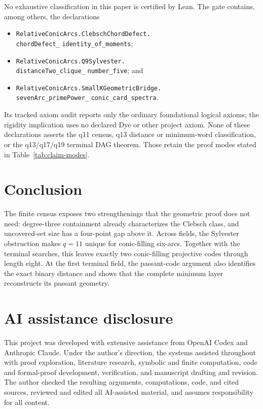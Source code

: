 \documentclass[11pt]{article}
\theoremstyle{remark}
\begin{document}
No exhaustive classification in this paper is certified by Lean.  The gate
contains, among others, the declarations
\begin{itemize}[nosep,leftmargin=2em]
\item \texttt{RelativeConicArcs.ClebschChordDefect.}\\
      \texttt{chordDefect\_}\allowbreak
      \texttt{identity\_of\_moments};
\item \texttt{RelativeConicArcs.Q9Sylvester.}\\
      \texttt{distanceTwo\_clique\_}\allowbreak
      \texttt{number\_five}; and
\item \texttt{RelativeConicArcs.SmallKGeometricBridge.}\\
      \texttt{sevenArc\_primePower\_}\allowbreak
      \texttt{conic\_card\_spectra}.
\end{itemize}
Its tracked axiom audit reports only the ordinary foundational logical axioms;
the rigidity implication uses no declared Dye or other project axiom.  None of these
declarations asserts the q11 census, q13 distance or minimum-word
classification, or the q13/q17/q19 terminal DAG theorem.  Those retain the
proof modes stated in Table~\ref{tab:claim-modes}.

\section{Conclusion}

The finite census exposes two strengthenings that the geometric proof does
not need: degree-three containment already characterizes the Clebsch class,
and uncovered-set size has a four-point gap above it.  Across fields, the
Sylvester obstruction makes $q=11$ unique for conic-filling six-arcs.
Together with the terminal searches, this leaves exactly two
conic-filling projective codes through length eight.  At the first
terminal field, the passant-code argument also identifies the exact binary
distance and shows that the complete minimum layer reconstructs its
passant geometry.

\section*{AI assistance disclosure}

This project was developed with extensive assistance from OpenAI Codex and
Anthropic Claude. Under the author's direction, the systems assisted
throughout with proof exploration, literature research, symbolic and finite
computation, code and formal-proof development, verification, and manuscript
drafting and revision. The author checked the resulting arguments,
computations, code, and cited sources, reviewed and edited all AI-assisted
material, and assumes responsibility for all content.
\end{document}

